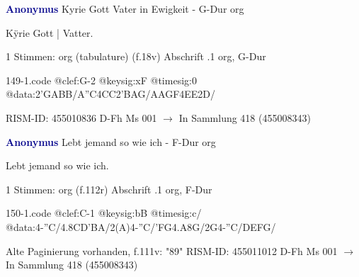 \documentclass[twocolumn]{book}
\begin{document}
\newline \par \vspace{7pt} \textcolor{darkblue}{\textbf{Anonymus  }}
\newline Kyrie Gott Vater in Ewigkeit - G-Dur
\newline org
\newline \begin{itshape}[f.18v, at left:] Kÿrie Gott | Vatter.\end{itshape} 
\newline \textcolor{darkblue}{}  1 Stimmen: org (tabulature)  (f.18v)
\newline Abschrift
.1  org, G-Dur  
\begin{filecontents*}{149-1.code}
@clef:G-2
@keysig:xF
@timesig:0
@data:2'GABB/A''C4CC2'BAG/AAGF4EE2D/
\end{filecontents*}
\newline
%
\newline RISM-ID: 455010836
\newline D-Fh  Ms 001
\newline $\rightarrow$ In Sammlung 418 (455008343)
      
\newline \par \vspace{7pt} \textcolor{darkblue}{\textbf{Anonymus  }}
\newline Lebt jemand so wie ich - F-Dur
\newline org
\newline \begin{itshape} Lebt jemand so wie ich.\end{itshape} 
\newline \textcolor{darkblue}{}  1 Stimmen: org  (f.112r)
\newline Abschrift
.1  org, F-Dur  
\begin{filecontents*}{150-1.code}
@clef:C-1
@keysig:bB
@timesig:c/
@data:4-''C/4.8CD'BA/2(A)4-''C/'FG4.A8G/2G4-''C/DEFG/
\end{filecontents*}
\newline
%
\newline Alte Paginierung vorhanden, f.111v: "89"
\newline RISM-ID: 455011012
\newline D-Fh  Ms 001
\newline $\rightarrow$ In Sammlung 418 (455008343)
      
\end{document}
